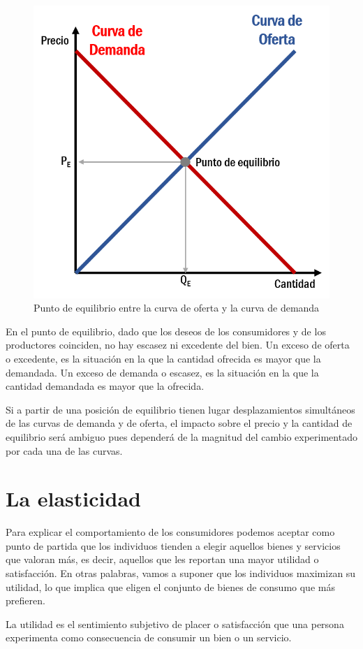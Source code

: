 \documentclass[
]{krantz}
\begin{document}
\begin{figure}

{\centering \includegraphics[width=0.5\linewidth]{images/12a-05} 

}

\caption{Punto de equilibrio entre la curva de oferta y la curva de demanda}\label{fig:12a-05}
\end{figure}

En el punto de equilibrio, dado que los deseos de los consumidores y de los productores coinciden, no hay escasez ni excedente del bien.
Un exceso de oferta o excedente, es la situación en la que la cantidad ofrecida es mayor que la demandada.
Un exceso de demanda o escasez, es la situación en la que la cantidad demandada es mayor que la ofrecida.

Si a partir de una posición de equilibrio tienen lugar desplazamientos simultáneos de las curvas de demanda y de oferta, el impacto sobre el precio y la cantidad de equilibrio será ambiguo pues dependerá de la magnitud del cambio experimentado por cada una de las curvas.

\hypertarget{la-elasticidad}{%
\chapter{La elasticidad}\label{la-elasticidad}}

Para explicar el comportamiento de los consumidores podemos aceptar como punto de partida que los individuos tienden a elegir aquellos bienes y servicios que valoran más, es decir, aquellos que les reportan una mayor utilidad o satisfacción. En otras palabras, vamos a suponer que los individuos maximizan su utilidad, lo que implica que eligen el conjunto de bienes de consumo que más prefieren.

La utilidad es el sentimiento subjetivo de placer o satisfacción que una persona experimenta como consecuencia de consumir un bien o un servicio.
\end{document}
